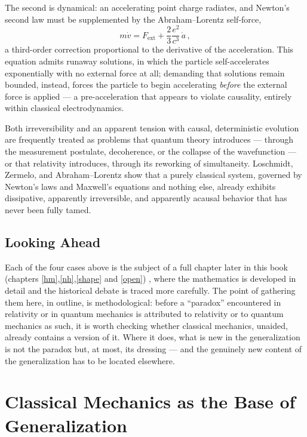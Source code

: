 The second is dynamical: an accelerating point charge radiates, and Newton's
second law must be supplemented by the Abraham--Lorentz self-force,
\begin{equation}
  m\dot v = F_{\text{ext}} + \frac{2}{3}\frac{e^2}{c^3}\,\dot a \, ,
\end{equation}
a third-order correction proportional to the derivative of the acceleration.
This equation admits runaway solutions, in which the particle self-accelerates
exponentially with no external force at all; demanding that solutions remain
bounded, instead, forces the particle to begin accelerating \emph{before} the
external force is applied --- a pre-acceleration that appears to violate
causality, entirely within classical electrodynamics.

Both irreversibility and an apparent tension with causal, deterministic
evolution are frequently treated as problems that quantum theory introduces
--- through the measurement postulate, decoherence, or the collapse of the
wavefunction --- or that relativity introduces, through its reworking of
simultaneity. Loschmidt, Zermelo, and Abraham--Lorentz show that a purely
classical system, governed by Newton's laws and Maxwell's equations and nothing
else, already exhibits dissipative, apparently irreversible, and apparently
acausal behavior that has never been fully tamed.

\subsection{Looking Ahead}

Each of the four cases above is the subject of a full chapter later in this
book (chapters \ref{hm},\ref{nh},\ref{shape} and \ref{open})
, where the mathematics is developed in detail and the historical debate is
traced more carefully. The point of gathering them here, in outline, is
methodological: before a ``paradox'' encountered in relativity or in quantum
mechanics is attributed to relativity or to quantum mechanics as such, it is
worth checking whether classical mechanics, unaided, already contains a version
of it. Where it does, what is new in the generalization is not the paradox but,
at most, its dressing --- and the genuinely new content of the generalization
has to be located elsewhere.

\section{Classical Mechanics as the Base of Generalization}
\label{cm:ba}

